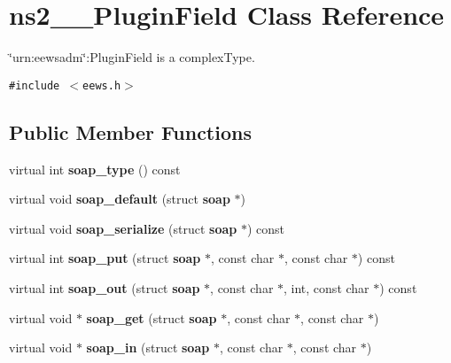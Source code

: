 \section{ns2\_\-\_\-PluginField Class Reference}
\label{classns2____PluginField}
\char`\"{}urn:eewsadm\char`\"{}:PluginField is a complexType.  


{\tt \#include $<$eews.h$>$}

\subsection*{Public Member Functions}
\begin{CompactItemize}
\item 
virtual int \textbf{soap\_\-type} () const \label{classns2____PluginField_aaabc63f18eb90f85b2c261936f6c319}

\item 
virtual void \textbf{soap\_\-default} (struct {\bf soap} $\ast$)\label{classns2____PluginField_c7131372170c642d5b63c86eaf5dbf94}

\item 
virtual void \textbf{soap\_\-serialize} (struct {\bf soap} $\ast$) const \label{classns2____PluginField_1943d0a0f2923ccf43464678850579da}

\item 
virtual int \textbf{soap\_\-put} (struct {\bf soap} $\ast$, const char $\ast$, const char $\ast$) const \label{classns2____PluginField_6a3ad68caa094f54b36e8db7a009e4e3}

\item 
virtual int \textbf{soap\_\-out} (struct {\bf soap} $\ast$, const char $\ast$, int, const char $\ast$) const \label{classns2____PluginField_5b05ab0b1e08976660b31ea81bc26bca}

\item 
virtual void $\ast$ \textbf{soap\_\-get} (struct {\bf soap} $\ast$, const char $\ast$, const char $\ast$)\label{classns2____PluginField_c8b6e5492481d519625a2cfb416ae4a8}

\item 
virtual void $\ast$ \textbf{soap\_\-in} (struct {\bf soap} $\ast$, const char $\ast$, const char $\ast$)\label{classns2____PluginField_b9ccba442260771754d2a5ba7e8cb617}

\end{CompactItemize}
